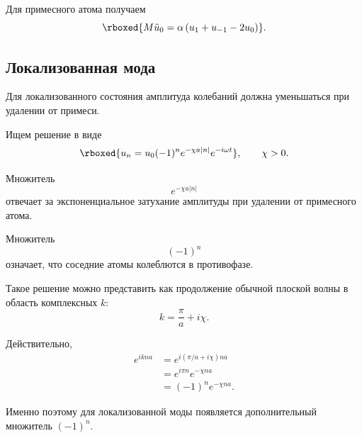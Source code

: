 \documentclass[../final.tex]{subfiles}
\begin{document}
Для примесного атома получаем
%
\begin{equation*}
    \rboxed{
        M\ddot u_0
        =
        \alpha
        \left(
            u_1
            +
            u_{-1}
            -
            2u_0
        \right)
    }.
\end{equation*}



\subsection*{Локализованная мода}

Для локализованного состояния амплитуда колебаний должна
уменьшаться при удалении от примеси.

Ищем решение в виде
%
\begin{equation*}
    \rboxed{
        u_n
        =
        u_0
        (-1)^n
        e^{-\chi a|n|}
        e^{-i\omega t}
    },
    \qquad
    \chi>0.
\end{equation*}

Множитель
%
\begin{equation*}
    e^{-\chi a|n|}
\end{equation*}
%
отвечает за экспоненциальное затухание амплитуды
при удалении от примесного атома.

Множитель
%
\begin{equation*}
    (-1)^n
\end{equation*}
%
означает, что соседние атомы колеблются в противофазе.

Такое решение можно представить как продолжение обычной
плоской волны в область комплексных $k$:
%
\begin{equation*}
    k
    =
    \frac{\pi}{a}
    +
    i\chi.
\end{equation*}

Действительно,
%
\begin{align*}
    e^{ikna}
    &=
    e^{i(\pi/a+i\chi)na}
    \\
    &=
    e^{i\pi n}
    e^{-\chi na}
    \\
    &=
    (-1)^n
    e^{-\chi na}.
\end{align*}

Именно поэтому для локализованной моды появляется
дополнительный множитель $(-1)^n$.


\end{document}
